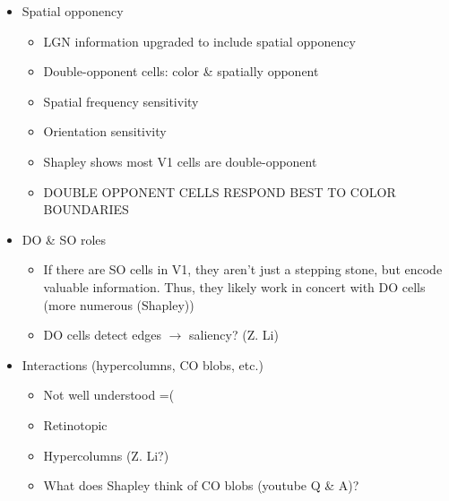 \documentclass[journal,onecolumn]{IEEEtran}
\begin{document}
\begin{enumerate}
\begin{itemize}
\begin{itemize}
                \end{itemize}
            \item Spatial opponency
                \begin{itemize}
                    \item LGN information upgraded to include spatial opponency
                    \item Double-opponent cells: color \& spatially opponent
                    \item Spatial frequency sensitivity
                    \item Orientation sensitivity
                    \item Shapley shows most V1 cells are double-opponent
                    \item DOUBLE OPPONENT CELLS RESPOND BEST TO COLOR BOUNDARIES
                \end{itemize}
            \item DO \& SO roles
                \begin{itemize}
                    \item If there are SO cells in V1, they aren't just a stepping stone, but encode valuable information. Thus, they likely work in concert with DO cells (more numerous (Shapley))
                    \item DO cells detect edges $\rightarrow$ saliency? (Z. Li)
                \end{itemize}
            \item Interactions (hypercolumns, CO blobs, etc.)
                \begin{itemize}
                    \item Not well understood =(
                    \item Retinotopic
                    \item Hypercolumns (Z. Li?)
                    \item What does Shapley think of CO blobs (youtube Q \& A)?
                \end{itemize}
        \end{itemize}
\end{enumerate}


\ifCLASSOPTIONcaptionsoff
  \newpage
\fi



\end{document}
